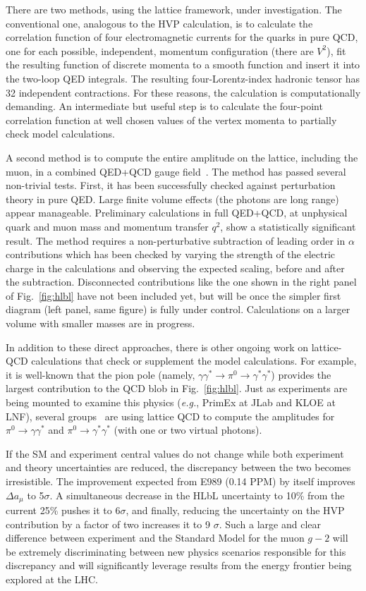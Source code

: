 There are two methods, using the lattice framework, under investigation. The conventional one, analogous to the HVP calculation, is to calculate the correlation function of four electromagnetic currents for the quarks in pure QCD, one for each possible, independent, momentum configuration (there are $V^2$), fit the resulting function of discrete momenta to a smooth function and insert it into the two-loop QED integrals. The resulting four-Lorentz-index hadronic tensor has 32 independent contractions. For these reasons, the calculation is computationally demanding. An intermediate but useful step is to calculate the four-point correlation function at well chosen values of the vertex momenta to partially check model calculations.

A second method is to compute the entire amplitude on the lattice, including the muon, in a  combined QED+QCD gauge field~\cite{hep-lat/9602005,hep-lat/0509016,827504}. The method has passed several non-trivial tests. First, it has been successfully checked against perturbation theory in pure QED. Large finite volume effects (the photons are long range) appear manageable. Preliminary calculations in full QED+QCD, at unphysical quark and muon mass and momentum transfer $q^2$, show a statistically significant result. The method requires a non-perturbative subtraction of leading order in $\alpha$ contributions which has been checked by varying the strength of the electric charge in the calculations and observing the expected scaling, before and after the subtraction. Disconnected contributions like the one shown in the right panel of Fig.~\ref{fig:hlbl} have not been included yet, but will be once the simpler first diagram (left panel, same figure) is fully under control. Calculations on a larger volume with smaller masses are in progress.

In addition to these direct approaches, there is other ongoing work on lattice-QCD calculations that check or
supplement the model calculations.
For example, it is well-known that the pion pole (namely, $\gamma\gamma^*\to\pi^0\to\gamma^*\gamma^*$)
provides the largest contribution to the QCD blob in Fig.~\ref{fig:hlbl}.
Just as experiments are being mounted to examine this physics (\emph{e.g.}, PrimEx at JLab and KLOE at LNF),
several groups~\cite{arXiv:0810.5550,arXiv:0912.0253,XFeng} are using lattice QCD to compute the amplitudes for
$\pi^0\to\gamma\gamma^*$ and $\pi^0\to\gamma^*\gamma^*$ (with one or two virtual photons).

If the SM and experiment central values do not change while both experiment and theory uncertainties are reduced, the discrepancy between the two becomes irresistible. The improvement expected from E989 (0.14 PPM) by itself improves $\Delta a_\mu$ to 5$\sigma$. A simultaneous decrease in the HLbL uncertainty to 10\% from the current 25\% pushes it to 6$\sigma$, and finally, reducing the uncertainty on the HVP contribution by a factor of two increases it to 9 $\sigma$. Such a large and clear difference between experiment and the Standard Model for the muon $g-2$ will be extremely  discriminating between new physics scenarios responsible for this discrepancy and will significantly leverage results from the energy frontier being explored at the LHC.



